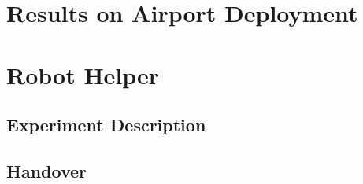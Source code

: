 \section{Results on Airport Deployment}


\section{Robot Helper}
\subsection{Experiment Description}
\subsection{Handover}




